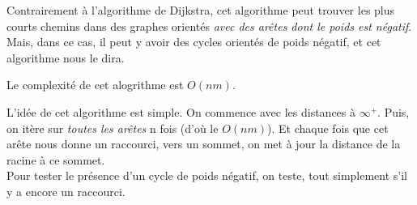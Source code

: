 \documentclass[french]{article}
\theoremstyle{definition}
\begin{document}
		Contrairement à l'algorithme de Dijkstra, cet algorithme peut trouver les plus courts chemins dans des graphes orientés \textit{avec des arêtes dont le poids est négatif}. Mais, dans ce cas, il peut y avoir des cycles orientés de poids négatif, et cet algorithme nous le dira.

		Le complexité de cet alogrithme est $O(nm)$.
		
		\begin{algorithmic}[1]
			\ENDFOR
					\ENDIF
				\ENDFOR
			\ENDFOR
				\ENDIF
			\ENDFOR
		\end{algorithmic}
		
		L'idée de cet algorithme est simple. On commence avec les distances à $\infty^+$. Puis, on itère sur \textit{toutes les arêtes} n fois (d'où le $O(nm)$). Et chaque fois que cet arête nous donne un raccourci, vers un sommet, on met à jour la distance de la racine à ce sommet.\\
		Pour tester le présence d'un cycle de poids négatif, on teste, tout simplement s'il y a encore un raccourci.
\end{document}
